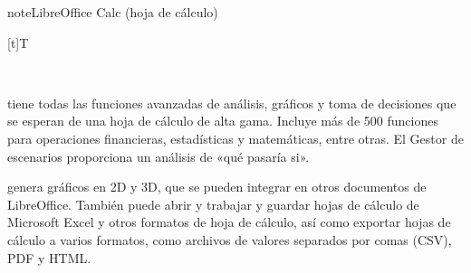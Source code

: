 \documentclass[letterpaper,10pt,spanish]{sphinxmanual}
\let\sphinxpxdimen\pdfpxdimen\else\newdimen\sphinxpxdimen
\begin{document}
\begin{sphinxadmonition}{note}{LibreOffice Calc (hoja de cálculo)}


\begin{savenotes}\sphinxattablestart
\sphinxthistablewithglobalstyle
\centering
\begin{tabulary}{\linewidth}[t]{T}
\sphinxtoprule
\sphinxtableatstartofbodyhook

\begin{sphinxfigure-in-table}
\centering
\capstart
\noindent\sphinxincludegraphics[width=190\sphinxpxdimen]{{image15}.png}
\label{\detokenize{1_guias/10ofimatica/G1012:id55}}\end{sphinxfigure-in-table}\relax
\\
\sphinxbottomrule
\end{tabulary}
\sphinxtableafterendhook\par
\sphinxattableend\end{savenotes}

\sphinxAtStartPar
{} tiene todas las funciones avanzadas de análisis, gráficos y toma de decisiones que se esperan de una hoja de cálculo de alta gama. Incluye más de 500 funciones para operaciones financieras, estadísticas y matemáticas, entre otras. El Gestor de escenarios proporciona un análisis de «qué pasaría si».

\sphinxAtStartPar
{} genera gráficos en 2D y 3D, que se pueden integrar en otros documentos de LibreOffice. También puede abrir y trabajar y guardar hojas de cálculo de Microsoft Excel y otros formatos de hoja de cálculo, así como exportar hojas de cálculo a varios formatos, como archivos de valores separados por comas (CSV), PDF y HTML.
\end{sphinxadmonition}
\end{document}

